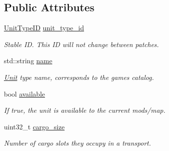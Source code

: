 \subsection*{Public Attributes}
\begin{DoxyCompactItemize}
\item 
\mbox{\label{structsc2_1_1_unit_type_data_a43563832b7287316ce6d1ff909dda831}} 
\hyperlink{classsc2_1_1_s_c2_type}{Unit\+Type\+ID} \hyperlink{structsc2_1_1_unit_type_data_a43563832b7287316ce6d1ff909dda831}{unit\+\_\+type\+\_\+id}
\begin{DoxyCompactList}\small\item\em Stable ID. This ID will not change between patches. \end{DoxyCompactList}\item 
\mbox{\label{structsc2_1_1_unit_type_data_aefb802f470411fdba19e6b4ecb503427}} 
std\+::string \hyperlink{structsc2_1_1_unit_type_data_aefb802f470411fdba19e6b4ecb503427}{name}
\begin{DoxyCompactList}\small\item\em \hyperlink{classsc2_1_1_unit}{Unit} type name, corresponds to the game\textquotesingle{}s catalog. \end{DoxyCompactList}\item 
\mbox{\label{structsc2_1_1_unit_type_data_a9269cf7ef9d4907c467b5367e5a6f210}} 
bool \hyperlink{structsc2_1_1_unit_type_data_a9269cf7ef9d4907c467b5367e5a6f210}{available}
\begin{DoxyCompactList}\small\item\em If true, the unit is available to the current mods/map. \end{DoxyCompactList}\item 
\mbox{\label{structsc2_1_1_unit_type_data_a13ab317cd91246aa40c928f48b801b38}} 
uint32\+\_\+t \hyperlink{structsc2_1_1_unit_type_data_a13ab317cd91246aa40c928f48b801b38}{cargo\+\_\+size}
\begin{DoxyCompactList}\small\item\em Number of cargo slots they occupy in a transport. \end{DoxyCompactList}\item 
\mbox{\label{structsc2_1_1_unit_type_data_a50b767a68415cb1acbf246ee7f52ddcb}} 

\end{DoxyCompactItemize}
